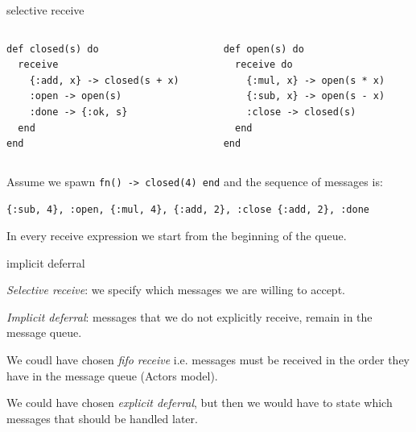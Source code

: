 \begin{frame}[fragile]{selective receive}

\begin{columns}
 \begin{column}{0.5\linewidth}
\begin{verbatim}
def closed(s) do 
  receive 
    {:add, x} -> closed(s + x)
    :open -> open(s)
    :done -> {:ok, s}
  end
end
\end{verbatim}
 \end{column}
\pause
 \begin{column}{0.5\linewidth}
\begin{verbatim}
def open(s) do
  receive do
    {:mul, x} -> open(s * x)
    {:sub, x} -> open(s - x)
    :close -> closed(s)
  end
end
\end{verbatim}
\end{column}
\end{columns}


\pause\vspace{10pt}

Assume we spawn {\tt fn() -> closed(4) end} and the sequence of messages is:

\vspace{10pt}

{\tt \{:sub, 4\}, :open, \{:mul, 4\}, \{:add, 2\}, :close \{:add, 2\}, :done}

\pause\vspace{10pt}

In every receive expression we start from the beginning of the queue.

\end{frame}


\begin{frame}{implicit deferral}

{\em Selective receive}: we specify which messages we are willing to accept.

\pause\vspace{20pt}

{\em Implicit deferral}: messages that we do not explicitly receive, remain in the message queue.

\pause\vspace{20pt}
We coudl have chosen {\em fifo receive} i.e. messages must be received
in the order they have in the message queue (Actors model).

\pause\vspace{20pt}

We could have chosen {\em explicit deferral}, but then we would have to
state which messages that should be handled later.

\end{frame}

